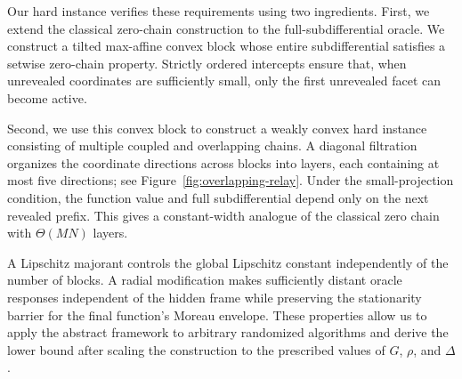 Our hard instance verifies these requirements using two ingredients.
First, we extend the classical zero-chain construction
\citep{CarmonEtAl2021} to the full-subdifferential oracle.
We construct a tilted max-affine convex block whose entire
subdifferential satisfies a setwise zero-chain property. Strictly
ordered intercepts ensure that, when unrevealed coordinates are
sufficiently small, only the first unrevealed facet can become active.

Second, we use this convex block to construct a weakly convex hard
instance consisting of multiple coupled and overlapping chains.
A diagonal filtration organizes the coordinate directions across
blocks into layers, each containing at most five directions; see
Figure~\ref{fig:overlapping-relay}. Under the small-projection condition,
the function value and full subdifferential depend only on the next
revealed prefix. This gives a constant-width analogue of the classical
zero chain with $\Theta(MN)$ layers.

A Lipschitz majorant controls the global Lipschitz constant
independently of the number of blocks. A radial modification makes
sufficiently distant oracle responses independent of the hidden
frame while preserving the stationarity barrier for the final
function's Moreau envelope. These properties allow us to apply the
abstract framework to arbitrary randomized algorithms and derive
the lower bound after scaling the construction to the prescribed
values of $G$, $\rho$, and $\Delta$.
\endgroup

